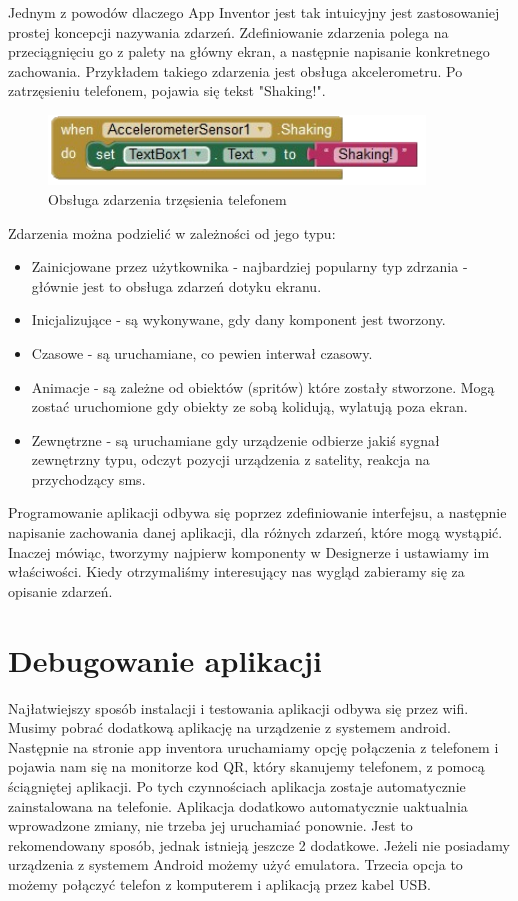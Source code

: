 Jednym z powodów dlaczego App Inventor jest tak intuicyjny jest zastosowaniej prostej koncepcji nazywania zdarzeń. Zdefiniowanie zdarzenia polega na przeciągnięciu go z palety na główny ekran, a następnie napisanie konkretnego zachowania. Przykładem takiego zdarzenia jest obsługa akcelerometru. Po zatrzęsieniu telefonem, pojawia się tekst "Shaking!".

\begin{figure}[th] 
\centering\includegraphics[width=10cm]{figures/shakingEvent}
\caption{Obsługa zdarzenia trzęsienia telefonem}
\end{figure}

Zdarzenia można podzielić w zależności od jego typu:
\begin{itemize}
\item Zainicjowane przez użytkownika - najbardziej popularny typ zdrzania - głównie jest to obsługa zdarzeń dotyku ekranu.
\item Inicjalizujące - są wykonywane, gdy dany komponent jest tworzony.
\item Czasowe - są uruchamiane, co pewien interwał czasowy.
\item Animacje - są zależne od obiektów (spritów) które zostały stworzone. Mogą zostać uruchomione gdy obiekty ze sobą kolidują, wylatują poza ekran.
\item Zewnętrzne - są uruchamiane gdy urządzenie odbierze jakiś sygnał zewnętrzny typu, odczyt pozycji urządzenia z satelity, reakcja na przychodzący sms.
\end{itemize}

Programowanie aplikacji odbywa się poprzez zdefiniowanie interfejsu, a następnie napisanie zachowania danej aplikacji, dla różnych zdarzeń, które mogą wystąpić. Inaczej mówiąc, tworzymy najpierw komponenty w Designerze i ustawiamy im właściwości. Kiedy otrzymaliśmy interesujący nas wygląd zabieramy się za opisanie zdarzeń.

\section{Debugowanie aplikacji}
\label{c33}

Najłatwiejszy sposób instalacji i testowania aplikacji odbywa się przez wifi. Musimy pobrać dodatkową aplikację na urządzenie z systemem android. Następnie na stronie app inventora uruchamiamy opcję połączenia z telefonem i pojawia nam się na monitorze kod QR, który skanujemy telefonem, z pomocą ściągniętej aplikacji. Po tych czynnościach aplikacja zostaje automatycznie zainstalowana na telefonie. Aplikacja dodatkowo automatycznie uaktualnia wprowadzone zmiany, nie trzeba jej uruchamiać ponownie. Jest to rekomendowany sposób, jednak istnieją jeszcze 2 dodatkowe. Jeżeli nie posiadamy urządzenia z systemem Android możemy użyć emulatora. Trzecia opcja to możemy połączyć telefon z komputerem i aplikacją przez kabel USB.